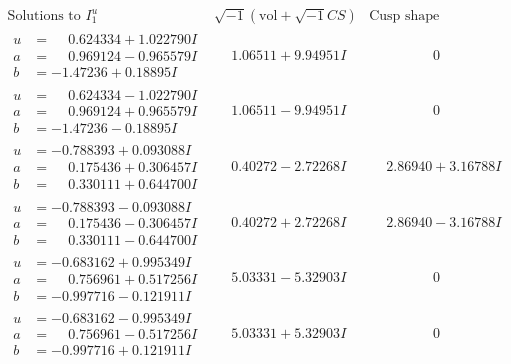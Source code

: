 \documentclass[1p]{elsarticle_modified}
\theoremstyle{definition}
\newcommand{\I}{\sqrt{-1}}
\begin{document}
$$\begin{array}{c|c|c}
\text{Solutions to }I^u_{1}& \I (\text{vol} + \sqrt{-1}CS) & \text{Cusp shape}\\
 \hline 
\begin{aligned}
u &= \phantom{-}0.624334 + 1.022790 I \\
a &= \phantom{-}0.969124 - 0.965579 I \\
b &= -1.47236 + 0.18895 I\end{aligned}
 & \phantom{-}1.06511 + 9.94951 I & \phantom{-0.000000 } 0 \\ \hline\begin{aligned}
u &= \phantom{-}0.624334 - 1.022790 I \\
a &= \phantom{-}0.969124 + 0.965579 I \\
b &= -1.47236 - 0.18895 I\end{aligned}
 & \phantom{-}1.06511 - 9.94951 I & \phantom{-0.000000 } 0 \\ \hline\begin{aligned}
u &= -0.788393 + 0.093088 I \\
a &= \phantom{-}0.175436 + 0.306457 I \\
b &= \phantom{-}0.330111 + 0.644700 I\end{aligned}
 & \phantom{-}0.40272 - 2.72268 I & \phantom{-}2.86940 + 3.16788 I \\ \hline\begin{aligned}
u &= -0.788393 - 0.093088 I \\
a &= \phantom{-}0.175436 - 0.306457 I \\
b &= \phantom{-}0.330111 - 0.644700 I\end{aligned}
 & \phantom{-}0.40272 + 2.72268 I & \phantom{-}2.86940 - 3.16788 I \\ \hline\begin{aligned}
u &= -0.683162 + 0.995349 I \\
a &= \phantom{-}0.756961 + 0.517256 I \\
b &= -0.997716 - 0.121911 I\end{aligned}
 & \phantom{-}5.03331 - 5.32903 I & \phantom{-0.000000 } 0 \\ \hline\begin{aligned}
u &= -0.683162 - 0.995349 I \\
a &= \phantom{-}0.756961 - 0.517256 I \\
b &= -0.997716 + 0.121911 I\end{aligned}
 & \phantom{-}5.03331 + 5.32903 I & \phantom{-0.000000 } 0 \\ \hline\begin{aligned}

\end{aligned}
\end{array}$$
\end{document}
